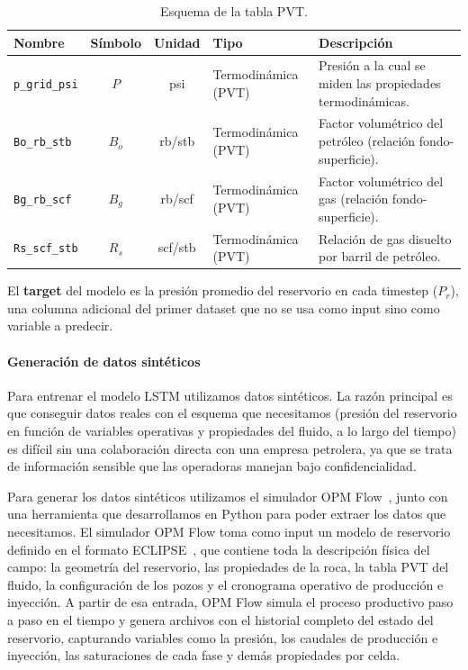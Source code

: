 \documentclass[12pt,a4paper]{article}
\begin{document}
\begin{table}[H]
\centering
\footnotesize
\begin{tabular}{|l|c|c|l|p{4.5cm}|}
  \hline
  \textbf{Nombre} & \textbf{Símbolo} & \textbf{Unidad} & \textbf{Tipo} & \textbf{Descripción} \\
  \hline
  \texttt{p\_grid\_psi} & $P$ & psi & Termodinámica (PVT) & Presión a la cual se miden las propiedades termodinámicas. \\
  \hline
  \texttt{Bo\_rb\_stb} & $B_o$ & rb/stb & Termodinámica (PVT) & Factor volumétrico del petróleo (relación fondo-superficie). \\
  \hline
  \texttt{Bg\_rb\_scf} & $B_g$ & rb/scf & Termodinámica (PVT) & Factor volumétrico del gas (relación fondo-superficie). \\
  \hline
  \texttt{Rs\_scf\_stb} & $R_s$ & scf/stb & Termodinámica (PVT) & Relación de gas disuelto por barril de petróleo. \\
  \hline
\end{tabular}
\caption{Esquema de la tabla PVT.}
\label{tab:dataset-pvt}
\end{table}

El \textbf{target} del modelo es la presión promedio del reservorio en cada timestep ($P_r$), una columna adicional
del primer dataset que no se usa como input sino como variable a predecir. 

\paragraph{Generación de datos sintéticos}

Para entrenar el modelo LSTM utilizamos datos sintéticos. La razón principal es que conseguir datos
reales con el esquema que necesitamos (presión del reservorio en función de variables operativas 
y propiedades del fluido, a lo largo del tiempo) es difícil sin una colaboración directa con una empresa petrolera,
ya que se trata de información sensible que las operadoras manejan bajo confidencialidad.

Para generar los datos sintéticos utilizamos el simulador OPM Flow~\cite{opmflow}, junto con una herramienta que desarrollamos
en Python para poder extraer los datos que necesitamos.
El simulador OPM Flow toma como input un modelo de reservorio definido en el formato ECLIPSE~\cite{eclipse}, que contiene toda la descripción física del
campo: la geometría del reservorio, las propiedades de la roca, la tabla PVT del fluido, la
configuración de los pozos y el cronograma operativo de producción e inyección. A partir de esa
entrada, OPM Flow simula el proceso productivo paso a paso en el tiempo y genera archivos
con el historial completo del estado del reservorio, capturando variables como la presión,
los caudales de producción e inyección, las saturaciones de cada fase y demás propiedades por celda.
\end{document}
